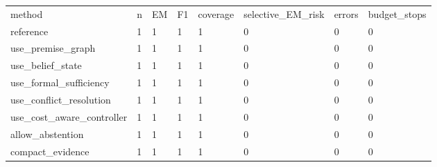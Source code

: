 \begin{tabular}{llllllll}
\hline
method & n & EM & F1 & coverage & selective\_EM\_risk & errors & budget\_stops \\
reference & 1 & 1 & 1 & 1 & 0 & 0 & 0 \\
use\_premise\_graph & 1 & 1 & 1 & 1 & 0 & 0 & 0 \\
use\_belief\_state & 1 & 1 & 1 & 1 & 0 & 0 & 0 \\
use\_formal\_sufficiency & 1 & 1 & 1 & 1 & 0 & 0 & 0 \\
use\_conflict\_resolution & 1 & 1 & 1 & 1 & 0 & 0 & 0 \\
use\_cost\_aware\_controller & 1 & 1 & 1 & 1 & 0 & 0 & 0 \\
allow\_abstention & 1 & 1 & 1 & 1 & 0 & 0 & 0 \\
compact\_evidence & 1 & 1 & 1 & 1 & 0 & 0 & 0 \\
\hline
\end{tabular}
